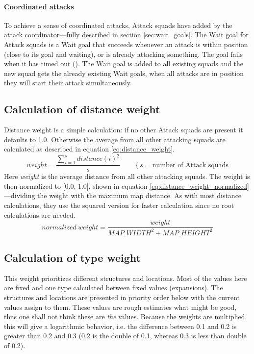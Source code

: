 \paragraph{Coordinated attacks}
To achieve a sense of coordinated attacks, Attack squads have  added by the attack coordinator—fully described in section \ref{sec:wait_goals}. The Wait goal for Attack squads is a Wait goal that succeeds whenever an attack is within position (close to its goal and waiting), or is already attacking something. The goal fails when it has timed out (\attackCoordinatorWaitGoalTimeout). The Wait goal is added to all existing squads and the new squad gets the already existing Wait goals, when all attacks are in position they will start their attack simultaneously.

\subsection{Calculation of distance weight}
Distance weight is a simple calculation: if no other Attack squads are present it defaults to 1.0. Otherwise the average from all other attacking squads are calculated as described in equation \ref{eq:distance_weight}.
\begin{equation}
\label{eq:distance_weight}
weight = \frac{\sum_{i=1}^{s}{distance(i)^2}}{s} \qquad \left\{s = \text{number of Attack squads}\right.
\end{equation}
Here \emph{weight} is the average distance from all other attacking squads. The weight is then normalized to [0.0, 1.0], shown in equation \ref{eq:distance_weight_normalized}—dividing the weight with the maximum map distance. As with most distance calculations, they use the squared version for faster calculation since no root calculations are needed.
\begin{equation}
\label{eq:distance_weight_normalized}
normalized\ weight = \frac{weight}{MAP\_WIDTH^2 + MAP\_HEIGHT^2}
\end{equation}


\subsection{Calculation of type weight}
This weight prioritizes different structures and locations. Most of the values here are fixed and one type calculated between fixed values (expansions). The structures and locations are presented in priority order below with the current values assign to them. These values are rough estimates what might be good, thus one shall not think these are \emph{the} values. Because the weights are multiplied this will give a logarithmic behavior, i.e. the difference between 0.1 and 0.2 is greater than 0.2 and 0.3 (0.2 is the double of 0.1, whereas 0.3 is less than double of 0.2).

